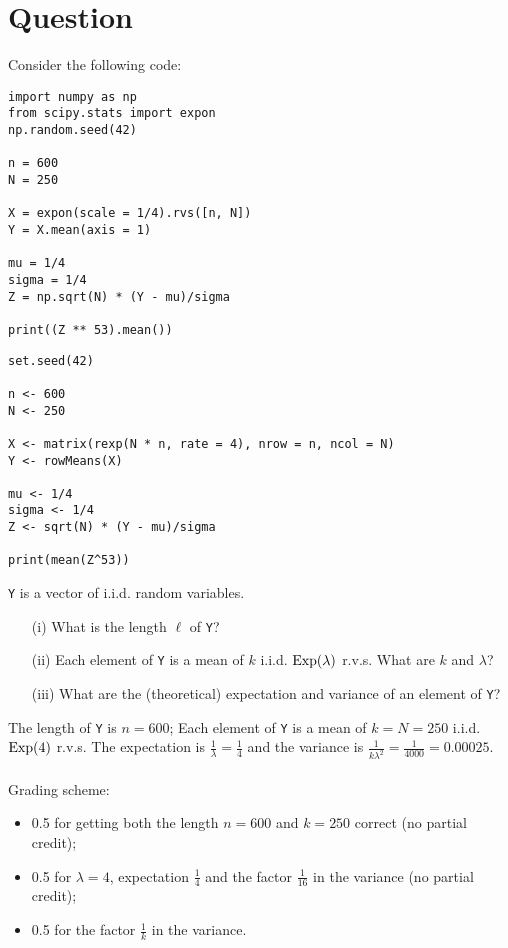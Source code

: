 \section*{Question}

Consider the following code:

\begin{verbatim}
import numpy as np
from scipy.stats import expon
np.random.seed(42)

n = 600
N = 250

X = expon(scale = 1/4).rvs([n, N])
Y = X.mean(axis = 1)

mu = 1/4
sigma = 1/4
Z = np.sqrt(N) * (Y - mu)/sigma

print((Z ** 53).mean())
\end{verbatim}

\begin{verbatim}
set.seed(42)

n <- 600
N <- 250

X <- matrix(rexp(N * n, rate = 4), nrow = n, ncol = N)
Y <- rowMeans(X)

mu <- 1/4
sigma <- 1/4
Z <- sqrt(N) * (Y - mu)/sigma

print(mean(Z^53))
\end{verbatim}

\vspace*{20pt}


\begin{exercise}[1.5]
\texttt{Y} is a vector of i.i.d. random variables.

\begin{itemize}
\item[(i)] What is the length $\ell$ of \texttt{Y}?
\item[(ii)] Each element of \texttt{Y} is a mean of $k$ i.i.d. $\mathrm{Exp}(\lambda)$ r.v.s.
What are $k$ and $\lambda$?  
\item[(iii)] What are the (theoretical) expectation and variance of an element of \texttt{Y}? 
\end{itemize} 

\begin{solution}
The length of \texttt{Y} is $n = 600$;  Each element of \texttt{Y} is a mean of $k = N = 250$ i.i.d. $\mathrm{Exp}(4)$ r.v.s.
The expectation is $\frac1\lambda = \frac14$ and the variance is $\frac1{k \lambda^2} = \frac1{4000} = 0.00025$. \\ \\
Grading scheme:
\begin{itemize}
\item 0.5 for getting both the length $n=600$ and  $k=250$ correct (no partial credit);
\item 0.5 for $\lambda = 4$, expectation $\frac14$ and the factor $\frac1{16}$ in the variance (no partial credit);
\item 0.5 for the factor $\frac1{k}$ in the variance.
\end{itemize}
\end{solution}
\end{exercise}

